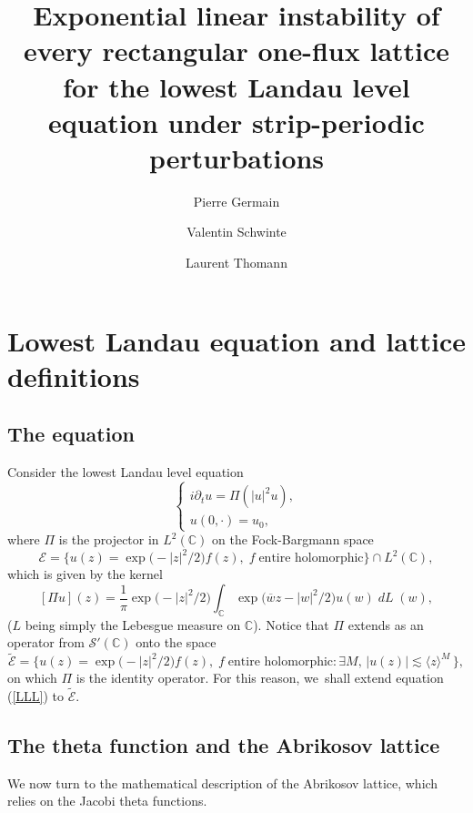 \documentclass[10pt]{amsart}
\let\sep:
\DeclareMathOperator{\dL}{\mathit{dL}}
\theoremstyle{definition}
\let\EE\exp
\let\ov\overline
\let\<\langle
\let\>\rangle
\newcommand\C{\mathbb C}
\begin{document}
\title{Exponential linear instability of every rectangular one-flux lattice for the lowest Landau level equation under strip-periodic perturbations}
\author{Pierre Germain \and Valentin Schwinte \and Laurent Thomann}
\maketitle
\section{Lowest Landau equation and lattice definitions}
\subsection{The equation}

Consider the lowest Landau level equation\vspace*{-3pt}
\begin{equation}\label{LLL}\tag{LLL}
\begin{cases}
i \partial_t u = \Pi (|u|^2 u),\\
u(0,\cdot)= u_0,
\end{cases}
\end{equation}
where $\Pi$ is the projector in $L^2(\C)$ on the Fock-Bargmann space\vspace*{-3pt}
\[
\mathcal{E} =\bigl\{ u(z) = \EE\bigl(-{|z|^2}/2\bigr) f(z),\;f \; \text{entire\ holomorphic}\bigr\}\cap L^2(\C),
\]
which is given by the kernel\vspace*{-3pt}
\begin{equation}\label{defPi}
[\Pi u](z) = \frac{1}{\pi} \EE\bigl(-{|z|^2}/2\bigr) \int_\mathbb{C} \EE\bigl(\ov w z - |w|^2/2\bigr) u(w) \dL(w),
\end{equation}
($L$ being simply the Lebesgue measure on $\C$). Notice that $\Pi $ extends as an operator from $\mathscr{S}'(\C)$ onto the space\vspace*{-3pt}
\[
\widetilde {\mathcal E}=\bigl\{ u(z) =\EE\bigl(-{|z|^2}/2\bigr) f(z),\;f \; \text{entire\ holomorphic}\sep\exists M,\, \vert u(z)\vert \lesssim \< z\>^M \, \bigr\},
\]
on which $\Pi $ is the identity operator. For this reason, we~shall extend equation (\ref{LLL}) to $\widetilde {\mathcal E}$.

\subsection{The theta function and the Abrikosov lattice} We now turn to the mathematical description of the Abrikosov lattice, which relies on the Jacobi theta functions.
\end{document}
